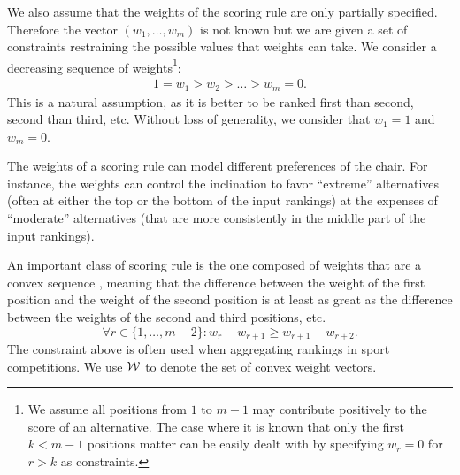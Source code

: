 \medskip
We also assume that the weights of the scoring rule are only partially specified.
Therefore the vector $(w_1,\ldots,w_m)$  is not known but we are given a set of constraints restraining the possible values that weights can take.
We consider a decreasing sequence of weights\footnote{We assume all positions from $1$ to $m-1$ may contribute positively to the score of an alternative. The case where it is known that only the first $k<m-1$ positions matter can be easily dealt with by specifying $w_r = 0$ for $r > k$ as constraints. }:
\begin{align}
1=w_{1} > w_{2} > \ldots > w_{m}=0. \label{eq:monotone}
\end{align}
This is a natural assumption, as it is better to be ranked first than second, second than third, etc. 
Without loss of generality, we consider that $w_1=1$ and $w_m=0$. 

The weights of a scoring rule can model different preferences of the chair. 
For instance, the weights can control the inclination to favor ``extreme'' alternatives (often at either the top or the bottom of the input rankings) at the expenses of ``moderate'' alternatives (that are more consistently in the middle part of the input rankings).

An important class of scoring rule is the one composed of weights that are a convex sequence \citep{Stein1994,Llamazares2016}, meaning that the difference between the weight of the first position and the weight of the second position is at least as great as the difference between the weights of the second and third positions, etc.
\begin{equation} 
\label{eq:convexity}
\forall r \in \{1,\ldots,m-2\}: w_r - w_{r+1} \geq w_{r+1}-w_{r+2}.
\end{equation}
The constraint above is often used when aggregating rankings in sport competitions.
We use $\mathcal{W}$ to denote the set of convex weight vectors.


